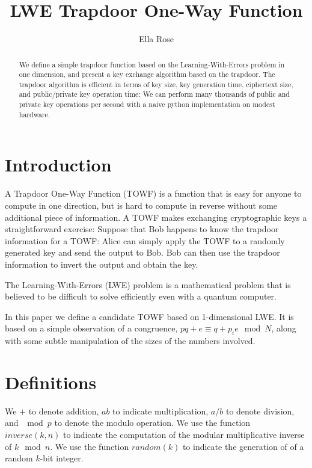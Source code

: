 \documentclass[preprint]{iacrtrans}
\author{Ella Rose}
\institute{Paso Robles, CA \email{python_pride@protonmail.com}}
\title[LWE Trapdoor One-Way Function]{LWE Trapdoor One-Way Function}
\begin{document}
\maketitle


\begin{abstract}
 We define a simple trapdoor function based on the Learning-With-Errors problem in one dimension, and present a key exchange algorithm based on the trapdoor. The trapdoor algorithm is efficient in terms of key size, key generation time, ciphertext size, and public/private key operation time: We can perform many thousands of public and private key operations per second with a naive python implementation on modest hardware. 
 \end{abstract}

\todototoc
\listoftodos


\section{Introduction}
A Trapdoor One-Way Function (TOWF) is a function that is easy for anyone to compute in one direction, but is hard to compute in reverse without some additional piece of information. A TOWF makes exchanging cryptographic keys a straightforward exercise: Suppose that Bob happens to know the trapdoor information for a TOWF: Alice can simply apply the TOWF to a randomly generated key and send the output to Bob. Bob can then use the trapdoor information to invert the output and obtain the key.  

The Learning-With-Errors (LWE) problem is a mathematical problem that is believed to be difficult to solve efficiently even with a quantum computer. 

In this paper we define a candidate TOWF based on 1-dimensional LWE. It is based on a simple observation of a congruence, $pq + e \equiv q + p_i e \mod N$, along with some subtle manipulation of the sizes of the numbers involved.

\section{Definitions}
We $+$ to denote addition, $a b$ to indicate multiplication, $a / b$ to denote division, and $\mod p$ to denote the modulo operation. We use the function $inverse(k, n)$ to indicate the computation of the modular multiplicative inverse of $k \mod n$. We use the function $random(k)$ to indicate the generation of of a random $k$-bit integer.
\end{document}
